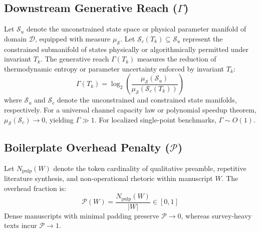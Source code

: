 \documentclass[twocolumn,10pt,letterpaper]{article}
\begin{document}
\subsection{Downstream Generative Reach ($\Gamma$)}
Let $\mathcal{S}_u$ denote the unconstrained state space or physical parameter manifold of domain $\mathcal{D}$, equipped with measure $\mu_{\mathcal{S}}$. Let $\mathcal{S}_c(T_k) \subseteq \mathcal{S}_u$ represent the constrained submanifold of states physically or algorithmically permitted under invariant $T_k$. The generative reach $\Gamma(T_k)$ measures the reduction of thermodynamic entropy or parameter uncertainty enforced by invariant $T_k$:
\begin{equation}
\Gamma(T_k) = \log_2 \left( \frac{\mu_{\mathcal{S}}(\mathcal{S}_u)}{\mu_{\mathcal{S}}(\mathcal{S}_c(T_k))} \right)
\end{equation}
where $\mathcal{S}_u$ and $\mathcal{S}_c$ denote the unconstrained and constrained state manifolds, respectively. For a universal channel capacity law or polynomial speedup theorem, $\mu_{\mathcal{S}}(\mathcal{S}_c) \to 0$, yielding $\Gamma \gg 1$. For localized single-point benchmarks, $\Gamma \sim O(1)$.

\subsection{Boilerplate Overhead Penalty ($\mathcal{P}$)}
Let $N_{\text{pulp}}(W)$ denote the token cardinality of qualitative preamble, repetitive literature synthesis, and non-operational rhetoric within manuscript $W$. The overhead fraction is:
\begin{equation}
\mathcal{P}(W) = \frac{N_{\text{pulp}}(W)}{|W|} \in [0, 1]
\end{equation}
Dense manuscripts with minimal padding preserve $\mathcal{P} \to 0$, whereas survey-heavy texts incur $\mathcal{P} \to 1$.
\end{document}
